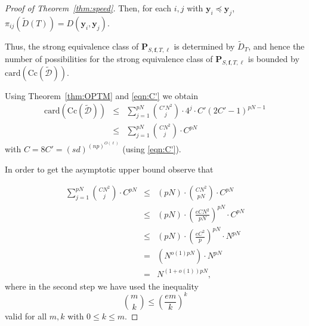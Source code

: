 \documentclass{amsart}[10pts]
\theoremstyle{definition}
\theoremstyle{remark}
\theoremstyle{observation}
\numberwithin{equation}{section}
\newcommand{\card}{\mathrm{card}}
\newcommand{\y}{\mathbf{y}}
\newcommand{\Cc}{\mathrm{Cc}}
\begin{document}
\begin{proof}[Proof of Theorem~\ref{thm:speed}]
    Then, for each $i,j$ with $\y_i \preceq \y_j$, $\pi_{ij}(\widetilde{D}(T)) = D(\y_i,\y_j)$.

    Thus, the strong equivalence class of $\mathbf{P}_{S,\mathbf{f},T,\ell}$ is determined by 
    $\widetilde{D}_T$, and hence the number of possibilities for the strong equivalence class of $\mathbf{P}_{S,\mathbf{f},T,\ell}$ is bounded by $\card(\Cc(\widetilde{\mathcal{D}}))$. 
    
    Using Theorem~\ref{thm:OPTM} and \eqref{eqn:C'} we obtain
    \begin{eqnarray*}
\card(\Cc(\widetilde{\mathcal{D}})) &\leq & 
\sum_{j=1}^{pN} \binom{C' N^2}{j} \cdot 4^j \cdot  C'(2C'-1)^{ p N-1 } \\
&\leq &
    \sum_{j=1}^{pN} \binom{C N^2}{j} \cdot C^{ p N}
    \end{eqnarray*}
with $C = 8 C' = (sd)^{(np)^{O(\ell)}}$ (using  \eqref{eqn:C'}).

In order to get the asymptotic upper bound observe that

\begin{eqnarray*}
 \sum_{j=1}^{pN} \binom{C N^2}{j} \cdot C^{ p N} &\leq&
 (p N) \cdot \binom{C N^2}{p N} \cdot C^{p N} \\
 &\leq &
 (p N)\cdot \left(\frac{e C N^2}{p N}\right)^{p N} \cdot  C^{p N } \\
 &\leq& (p N) \cdot  \left(\frac{e C^2}{p}\right)^{p N} \cdot N^{p N} \\
 &=&\left (N^{o(1) pN}\right) \cdot N^{p N} \\
 &=& N^{(1+o(1))p N},
 \end{eqnarray*}
where in the second step we have used the inequality
\[
\binom{m}{k} \leq \left(\frac{em}{k}\right)^k
\]
valid for all $m,k$ with $0 \leq k \leq m$.

\end{proof}
\end{document}
